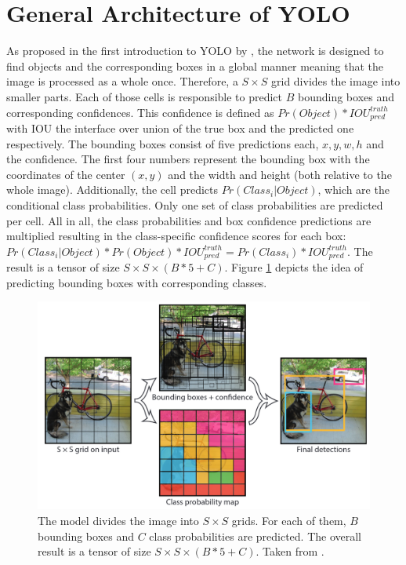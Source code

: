 \section{General Architecture of YOLO}
As proposed in the first introduction to YOLO by \cite{yolov1}, the network is designed to find objects and the corresponding boxes in a global manner meaning that the image is processed as a whole once. Therefore, a $ S \times S $ grid divides the image into smaller parts. Each of those cells is responsible to predict $ B $ bounding boxes and corresponding confidences. This confidence is defined as $ Pr(Object) * IOU_{pred}^{truth} $ with IOU the interface over union of the true box and the predicted one respectively. The bounding boxes consist of five predictions each, $ x, y, w, h $ and the confidence. The first four numbers represent the bounding box with the coordinates of the center $ (x,y) $ and the width and height (both relative to the whole image). Additionally, the cell predicts $ Pr(Class_i|Object) $, which are the conditional class probabilities. Only one set of class probabilities are predicted per cell. All in all, the class probabilities and box confidence predictions are multiplied resulting in the class-specific confidence scores for each box: $ Pr(Class_i|Object) * Pr(Object) * IOU_{pred}^{truth} = Pr(Class_i) * IOU_{pred}^{truth} $. The result is a tensor of size $ S \times S \times (B * 5 + C) $. Figure \ref{fig:YOLO_idea} depicts the idea of predicting bounding boxes with corresponding classes.
 
\begin{figure}[htb!]
	\centering
	\includegraphics[scale=0.3]{figures/YOLO_functionality.png}
	\caption{The model divides the image into $ S \times S $ grids. For each of them, $ B $ bounding boxes and $ C $ class probabilities are predicted. The overall result is a tensor of size $ S \times S \times (B*5 + C) $. Taken from \cite{yolov1}.}
	\label{fig:YOLO_idea}
\end{figure}

